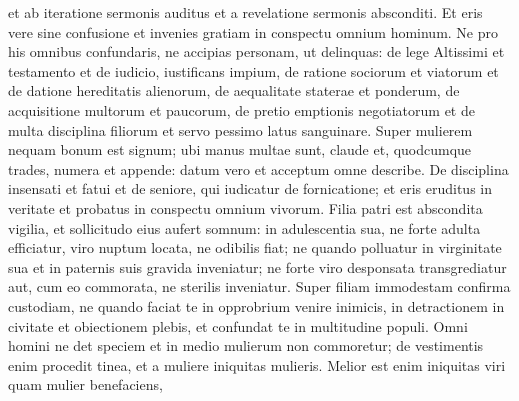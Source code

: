\begin{biblechapter}
\begin{biblechapter}
\begin{biblechapter}
\begin{biblechapter}
\begin{biblechapter}
\begin{biblechapter}
\begin{biblechapter}
\begin{biblechapter}
\begin{biblechapter}
\begin{biblechapter}
\begin{biblechapter}
\begin{biblechapter}
\begin{biblechapter}
\begin{biblechapter}
\begin{biblechapter}
\begin{biblechapter}
\begin{biblechapter}
\begin{biblechapter}
\begin{biblechapter}
\begin{biblechapter}
\begin{biblechapter}
\begin{biblechapter}
\begin{biblechapter}
\begin{biblechapter}
\begin{biblechapter}
\begin{biblechapter}
\begin{biblechapter}
\begin{biblechapter}
\begin{biblechapter}
\begin{biblechapter}
\begin{biblechapter}
\begin{biblechapter}
\begin{biblechapter}
\begin{biblechapter}
\begin{biblechapter}
\begin{biblechapter}
\begin{biblechapter}
\begin{biblechapter}
\begin{biblechapter}
\begin{biblechapter}
\begin{biblechapter}
\begin{biblechapter}
\verse et ab iteratione sermonis auditus
 et a revelatione sermonis absconditi.
 Et eris vere sine confusione
 et invenies gratiam in conspectu omnium hominum.
 Ne pro his omnibus confundaris,
 ne accipias personam, ut delinquas:
 \verse de lege Altissimi et testamento
 et de iudicio, iustificans impium,
 \verse de ratione sociorum et viatorum
 et de datione hereditatis alienorum,
 \verse de aequalitate staterae et ponderum,
 de acquisitione multorum et paucorum,
 \verse de pretio emptionis negotiatorum
 et de multa disciplina filiorum
 et servo pessimo latus sanguinare.
 \verse Super mulierem nequam bonum est signum;
 \verse ubi manus multae sunt, claude
 et, quodcumque trades, numera et appende:
 datum vero et acceptum omne describe.
 \verse De disciplina insensati et fatui
 et de seniore, qui iudicatur de fornicatione;
 et eris eruditus in veritate
 et probatus in conspectu omnium vivorum.
 \verse Filia patri est abscondita vigilia,
 et sollicitudo eius aufert somnum:
 in adulescentia sua, ne forte adulta efficiatur,
 viro nuptum locata, ne odibilis fiat;
 \verse ne quando polluatur in virginitate sua
 et in paternis suis gravida inveniatur;
 ne forte viro desponsata transgrediatur
 aut, cum eo commorata, ne sterilis inveniatur.
 \verse Super filiam immodestam confirma custodiam,
 ne quando faciat te in opprobrium venire inimicis,
 in detractionem in civitate et obiectionem plebis,
 et confundat te in multitudine populi.
 \verse Omni homini ne det speciem
 et in medio mulierum non commoretur;
 \verse de vestimentis enim procedit tinea,
 et a muliere iniquitas mulieris.
 \verse Melior est enim iniquitas viri quam mulier benefaciens,

\end{biblechapter}
\end{biblechapter}
\end{biblechapter}
\end{biblechapter}
\end{biblechapter}
\end{biblechapter}
\end{biblechapter}
\end{biblechapter}
\end{biblechapter}
\end{biblechapter}
\end{biblechapter}
\end{biblechapter}
\end{biblechapter}
\end{biblechapter}
\end{biblechapter}
\end{biblechapter}
\end{biblechapter}
\end{biblechapter}
\end{biblechapter}
\end{biblechapter}
\end{biblechapter}
\end{biblechapter}
\end{biblechapter}
\end{biblechapter}
\end{biblechapter}
\end{biblechapter}
\end{biblechapter}
\end{biblechapter}
\end{biblechapter}
\end{biblechapter}
\end{biblechapter}
\end{biblechapter}
\end{biblechapter}
\end{biblechapter}
\end{biblechapter}
\end{biblechapter}
\end{biblechapter}
\end{biblechapter}
\end{biblechapter}
\end{biblechapter}
\end{biblechapter}
\end{biblechapter}
